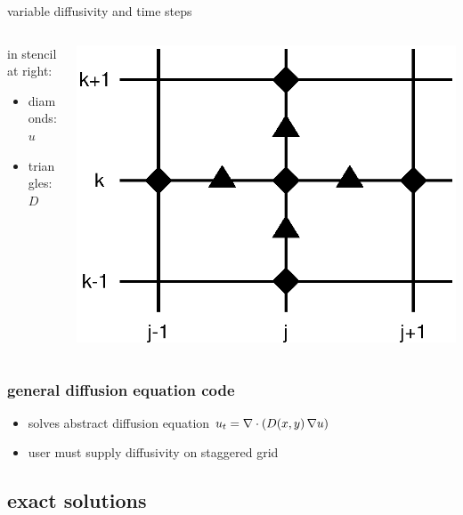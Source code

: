 \begin{frame}{variable diffusivity and time steps}
\vspace{-0.15in}
\small
\begin{columns}
\begin{column}{0.55\textwidth}
in stencil at right:
\begin{itemize}
\item[] diamonds: $u$
\item[] triangles: $D$
\end{itemize}
\end{column}
\begin{column}{0.45\textwidth}
\begin{center}
\vspace{-0.15in}
\includegraphics[width=1.0\textwidth]{pdffigs/diffstencil}
\end{center}
\end{column}
\end{columns}
\end{frame}


\begin{frame}
  \frametitle{general diffusion equation code}


\small
\begin{itemize}
\item solves abstract diffusion equation $u_t = \nabla\cdot \left(D(x,y)\, \nabla u\right)$
\item user must supply diffusivity on staggered grid
\end{itemize}
\end{frame}


\subsection{exact solutions}

